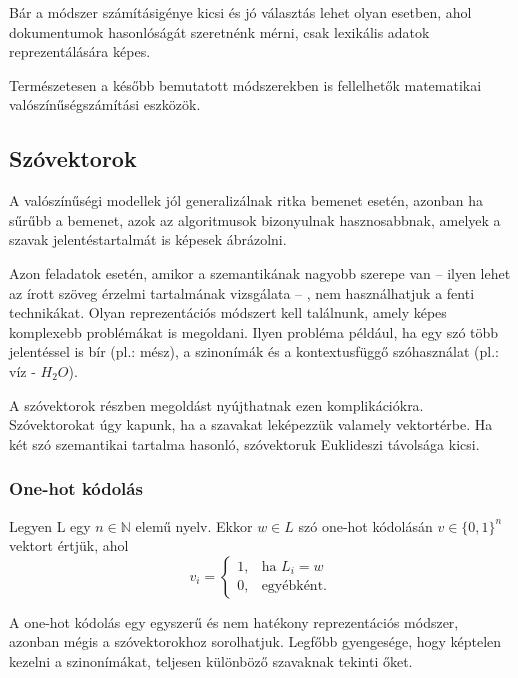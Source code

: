 Bár a módszer számításigénye kicsi és jó választás lehet olyan esetben, ahol dokumentumok hasonlóságát szeretnénk mérni, csak lexikális adatok reprezentálására képes. 

\begin{note}
	Természetesen a később bemutatott módszerekben is fellelhetők matematikai valószínűségszámítási eszközök.
\end{note}

\subsection{Szóvektorok}

A valószínűségi modellek jól generalizálnak ritka bemenet esetén, azonban ha sűrűbb a bemenet, azok az algoritmusok bizonyulnak hasznosabbnak, amelyek a szavak jelentéstartalmát is képesek ábrázolni.

Azon feladatok esetén, amikor a szemantikának nagyobb szerepe van – ilyen lehet az írott szöveg érzelmi tartalmának vizsgálata – , nem használhatjuk a fenti technikákat. Olyan reprezentációs módszert kell találnunk, amely képes komplexebb problémákat is megoldani. Ilyen probléma például, ha egy szó több jelentéssel is bír (pl.: mész), a szinonímák és a kontextusfüggő szóhasználat (pl.: víz - $H_2O$).

A szóvektorok részben megoldást nyújthatnak ezen komplikációkra. Szóvektorokat úgy kapunk, ha a szavakat leképezzük valamely vektortérbe. Ha két szó szemantikai tartalma hasonló, szóvektoruk Euklideszi távolsága kicsi.

\subsubsection{One-hot kódolás}

\begin{definition}
Legyen L egy $n \in \mathbb{N}$ elemű nyelv. Ekkor $w \in L$ szó one-hot kódolásán $v \in \{0,1\}^n$ vektort értjük, ahol 
\[
v_i= 
\begin{cases}
1,				& \text{ha } L_i = w\\
0,              & \text{egyébként.}
\end{cases}
\]
\end{definition}

A one-hot kódolás egy egyszerű és nem hatékony reprezentációs módszer, azonban mégis a szóvektorokhoz sorolhatjuk. Legfőbb gyengesége, hogy képtelen kezelni a szinonímákat, teljesen különböző szavaknak tekinti őket.

